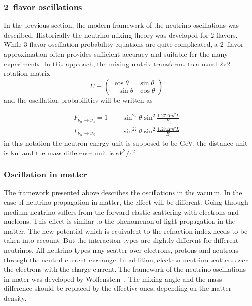 \documentclass[../main.tex]{subfiles}
\begin{document}
\subsubsection{2--flavor oscillations}
In the previous section, the modern framework of the neutrino oscillations was described. Historically the neutrino mixing theory was developed for 2 flavors. While 3-flavor oscillation probability equations are quite complicated, a 2--flavor approximation often provides sufficient accuracy and suitable for the many experiments. In this approach, the mixing matrix transforms to a usual 2x2 rotation matrix
\begin{equation}
U=
\begin{pmatrix}
\cos\theta    & \sin\theta     \\
-\sin\theta   & \cos\theta
\end{pmatrix}
\end{equation}
and the oscillation probabilities will be written as

\begin{align}
P_{\nu_\alpha\to\nu_\alpha}=1-&\sin^22\theta\sin^2\frac{1.27\Delta m^2L}{E_\nu} \\
P_{\nu_\alpha\to\nu_\beta}=&\sin^22\theta\sin^2\frac{1.27\Delta m^2L}{E_\nu}
\end{align}
in this notation the neutron energy unit is supposed to be GeV, the distance unit is km and the mass difference unit is $eV^2/c^2$.

\subsubsection{Oscillation in matter}
\label{sc:intro:mat}
The framework presented above describes the oscillations in the vacuum. In the case of neutrino propagation in matter, the effect will be different. Going through medium neutrino suffers from the forward elastic scattering with electrons and nucleons. This effect is similar to the phenomenon of light propagation in the matter. The new potential which is equivalent to the refraction index needs to be taken into account. But the interaction types are slightly different for different neutrinos. All neutrino types may scatter over electrons, protons and neutrons through the neutral current exchange. In addition, electron neutrino scatters over the electrons with the charge current. The framework of the neutrino oscillations in mater was developed by Wolfenstein~\cite{Wolfenstein1978}. The mixing angle and the mass difference should be replaced by the effective ones, depending on the matter density.
\end{document}

